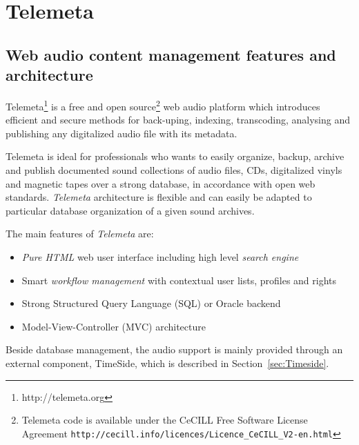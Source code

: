 \documentclass{paper}
\begin{document}
 \section{Telemeta}\label{sec:Telemeta}
 \subsection{Web audio content management features and architecture}
 Telemeta\footnote{http://telemeta.org} is a free and open source\footnote{Telemeta code is available under the CeCILL Free Software License Agreement \texttt{http://cecill.info/licences/Licence\_CeCILL\_V2-en.html}} web audio platform which introduces efficient and secure methods for back-uping, indexing, transcoding, analysing and publishing any digitalized audio file with its metadata. 


Telemeta is ideal for professionals who wants to easily organize, backup, archive and publish documented sound collections of audio files, CDs, digitalized vinyls and magnetic tapes over a strong database, in accordance with open web standards. 
\emph{Telemeta} architecture is flexible and can easily be adapted to particular database organization of a given sound archives. 

The main features of \emph{Telemeta} are:
\begin{itemize}
\item \emph{Pure HTML} web user interface including high level \emph{search engine}
\item Smart \emph{workflow management} with contextual user lists, profiles and rights
\item Strong Structured Query Language (SQL) or Oracle backend
\item Model-View-Controller (MVC) architecture 
\end{itemize}
Beside database management, the audio support is mainly provided through an external component, TimeSide, which is described in Section~\ref{sec:Timeside}.
\end{document}
